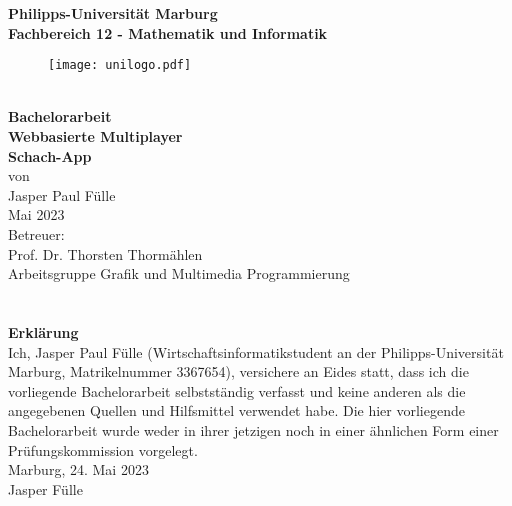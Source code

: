 \begin{titlepage}
\begin{center}
{\huge \textbf{Philipps-Universität Marburg}}\\[0.5cm]
\textbf{Fachbereich 12 - Mathematik und Informatik}\\[0.5cm]

\begin{figure}[h]
	\centering
		\texttt{[image: unilogo.pdf]}
\end{figure}

{\huge \textbf{{\large \\[1cm]Bachelorarbeit}}}
\\[1cm]

{\Huge \textbf{Webbasierte Multiplayer\\ Schach-App}}
\\[1cm]

{\large von}\\
{\large Jasper Paul Fülle}\\
{\large Mai 2023}\\[3cm]

{\large
Betreuer:\\ Prof. Dr. Thorsten Thormählen\\[1cm]
Arbeitsgruppe Grafik und Multimedia Programmierung}

\end{center}
\end{titlepage}
\newpage
\thispagestyle{empty}
\section*{}
\newpage
\thispagestyle{empty}
\vspace*{7cm}
\textbf{\Large {Erklärung}}\\[0.5cm]
Ich, Jasper Paul Fülle (Wirtschaftsinformatikstudent an der Philipps-Universität Marburg, Matrikelnummer
3367654), versichere an Eides statt, dass ich die vorliegende Bachelorarbeit selbstständig verfasst und keine anderen
als die angegebenen Quellen und Hilfsmittel verwendet habe. Die hier vorliegende Bachelorarbeit wurde weder in ihrer jetzigen noch in einer ähnlichen Form einer Prüfungskommission vorgelegt.\\[1cm]
Marburg, 24. Mai 2023\\[0.5cm]
Jasper Fülle
\newpage
\shipout\null

\renewcommand{\abstractname}{Kurzzusammenfassung}